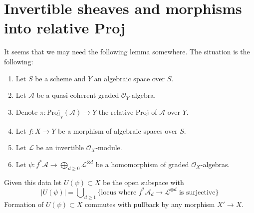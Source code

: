 \section{Invertible sheaves and morphisms into relative Proj}
\label{spaces-divisors-section-invertible-relative-proj}
It seems that we may need the following lemma somewhere.
The situation is the following:
\begin{enumerate}
\item Let $S$ be a scheme and $Y$ an algebraic space over $S$.
\item Let $\mathcal{A}$ be a quasi-coherent graded $\mathcal{O}_Y$-algebra.
\item Denote $\pi : \underline{\text{Proj}}_Y(\mathcal{A}) \to Y$ the relative
Proj of $\mathcal{A}$ over $Y$.
\item Let $f : X \to Y$ be a morphism of algebraic spaces over $S$.
\item Let $\mathcal{L}$ be an invertible $\mathcal{O}_X$-module.
\item Let
$\psi : f^*\mathcal{A} \to \bigoplus_{d \geq 0} \mathcal{L}^{\otimes d}$
be a homomorphism of graded $\mathcal{O}_X$-algebras.
\end{enumerate}
Given this data let $U(\psi) \subset X$ be the open subspace with
$$
|U(\psi)| = \bigcup\nolimits_{d \geq 1}
\{\text{locus where }f^*\mathcal{A}_d \to \mathcal{L}^{\otimes d}
\text{ is surjective}\}
$$
Formation of $U(\psi) \subset X$ commutes with
pullback by any morphism $X' \to X$.

